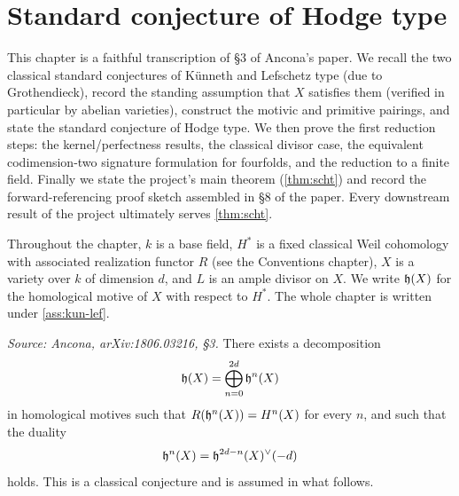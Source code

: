 \chapter{Standard conjecture of Hodge type}

This chapter is a faithful transcription of \S3 of Ancona's paper. We recall the
two classical standard conjectures of K\"unneth and Lefschetz type (due to
Grothendieck), record the standing assumption that \(X\) satisfies them
(verified in particular by abelian varieties), construct the motivic and
primitive pairings, and state the standard conjecture of Hodge type. We then
prove the first reduction steps: the kernel/perfectness results, the classical
divisor case, the equivalent codimension-two signature formulation for
fourfolds, and the reduction to a finite field. Finally we state the project's
main theorem (\cref{thm:scht}) and record the forward-referencing proof sketch
assembled in \S8 of the paper. Every downstream result of the project ultimately
serves \cref{thm:scht}.

Throughout the chapter, \(k\) is a base field, \(H^*\) is a fixed classical Weil
cohomology with associated realization functor \(R\) (see the Conventions
chapter), \(X\) is a variety over \(k\) of dimension \(d\), and \(L\) is an ample
divisor on \(X\). We write \(\mathfrak{h}(X)\) for the homological motive of \(X\) with
respect to \(H^*\). The whole chapter is written under
\cref{ass:kun-lef}.

\begin{conjecture}
  \label{conj:kunneth}
  \textit{Source: Ancona, arXiv:1806.03216, §3.}
  There exists a decomposition
  \[\mathfrak{h}(X) = \bigoplus_{n=0}^{2d} \mathfrak{h}^n(X)\]
  in homological motives such that \(R(\mathfrak{h}^n(X)) = H^n(X)\) for every \(n\), and
  such that the duality
  \[\mathfrak{h}^n(X) = \mathfrak{h}^{2d-n}(X)^{\vee}(-d)\]
  holds. This is a classical conjecture and is assumed in what follows.
\end{conjecture}

